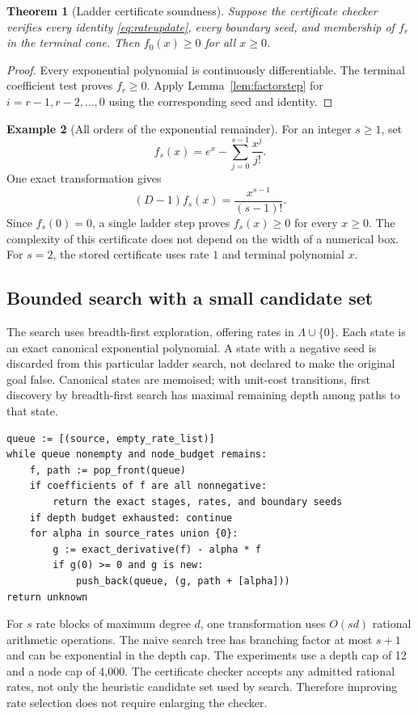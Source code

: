 \documentclass[11pt,a4paper]{article}
\newtheorem{theorem}{Theorem}[section]
\theoremstyle{definition}\newtheorem{definition}[theorem]{Definition}
\newtheorem{example}[theorem]{Example}
\begin{document}
\begin{theorem}[Ladder certificate soundness]
Suppose the certificate checker verifies every identity
\eqref{eq:rateupdate}, every boundary seed, and membership of $f_r$ in the
terminal cone. Then $f_0(x)\ge0$ for all $x\ge0$.
\end{theorem}
\begin{proof}
Every exponential polynomial is continuously differentiable. The terminal
coefficient test proves $f_r\ge0$. Apply Lemma~\ref{lem:factorstep} for
$i=r-1,r-2,\ldots,0$ using the corresponding seed and identity.
\end{proof}

\begin{example}[All orders of the exponential remainder]
For an integer $s\ge1$, set
\[
 f_s(x)=e^x-\sum_{j=0}^{s-1}\frac{x^j}{j!}.
\]
One exact transformation gives
\[
 (D-1)f_s(x)=\frac{x^{s-1}}{(s-1)!}.
\]
Since $f_s(0)=0$, a single ladder step proves $f_s(x)\ge0$ for every $x\ge0$.
The complexity of this certificate does not depend on the width of a numerical
box. For $s=2$, the stored certificate uses rate $1$ and terminal polynomial $x$.
\end{example}

\subsection{Bounded search with a small candidate set}

The search uses breadth-first exploration, offering rates in
$\Lambda\cup\{0\}$. Each state is an exact canonical exponential polynomial.
A state with a negative seed is discarded from this particular ladder search,
not declared to make the original goal false. Canonical states are memoised;
with unit-cost transitions, first discovery by breadth-first search has maximal
remaining depth among paths to that state.

\begin{lstlisting}
queue := [(source, empty_rate_list)]
while queue nonempty and node_budget remains:
    f, path := pop_front(queue)
    if coefficients of f are all nonnegative:
        return the exact stages, rates, and boundary seeds
    if depth budget exhausted: continue
    for alpha in source_rates union {0}:
        g := exact_derivative(f) - alpha * f
        if g(0) >= 0 and g is new:
            push_back(queue, (g, path + [alpha]))
return unknown
\end{lstlisting}

For $s$ rate blocks of maximum degree $d$, one transformation uses $O(sd)$
rational arithmetic operations. The naive search tree has branching factor at
most $s+1$ and can be exponential in the depth cap. The experiments use a depth
cap of 12 and a node cap of 4,000. The certificate checker accepts any admitted
rational rates, not only the heuristic candidate set used by search. Therefore
improving rate selection does not require enlarging the checker.
\end{document}
